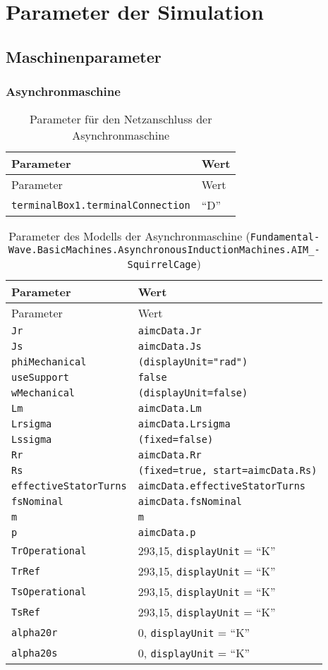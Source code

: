 \chapter{Parameter der Simulation}
\label{chap:ParameterDerSimulation}

\hypertarget{maschinenparameter}{%
\section{Maschinenparameter}\label{maschinenparameter}}

\hypertarget{asynchronmaschine}{%
\subsection{Asynchronmaschine}\label{asynchronmaschine}}
\begin{longtable}[]{@{}ll@{}}
\caption{Parameter für den Netzanschluss der
Asynchronmaschine}\tabularnewline
\toprule
Parameter & Wert\tabularnewline
\midrule
\endfirsthead
\toprule
Parameter & Wert\tabularnewline
\midrule
\endhead
\texttt{terminalBox1.terminalConnection} & ``D''\tabularnewline
\bottomrule
\end{longtable}

\begin{longtable}[]{@{}ll@{}}
\caption{Parameter des Modells der Asynchronmaschine
(\texttt{Fun­da­men­tal­Wave.­Basic­Ma­chines.­Asyn­chro­nous­In­duc­tion­Ma­chines.­AIM\_­Squir­rel­Cage})}\tabularnewline
\toprule
Parameter & Wert\tabularnewline
\midrule
\endfirsthead
\toprule
Parameter & Wert\tabularnewline
\midrule
\endhead
\texttt{Jr} & \texttt{aimcData.Jr}\tabularnewline
\texttt{Js} & \texttt{aimcData.Js}\tabularnewline
\texttt{phiMechanical} & \texttt{(displayUnit="rad")}\tabularnewline
\texttt{useSupport} & \texttt{false}\tabularnewline
\texttt{wMechanical} & \texttt{(displayUnit=false)}\tabularnewline
\texttt{Lm} & \texttt{aimcData.Lm}\tabularnewline
\texttt{Lrsigma} & \texttt{aimcData.Lrsigma}\tabularnewline
\texttt{Lssigma} & \texttt{(fixed=false)}\tabularnewline
\texttt{Rr} & \texttt{aimcData.Rr}\tabularnewline
\texttt{Rs} & \texttt{(fixed=true,\ start=aimcData.Rs)}\tabularnewline
\texttt{effectiveStatorTurns} &
\texttt{aimcData.effectiveStatorTurns}\tabularnewline
\texttt{fsNominal} & \texttt{aimcData.fsNominal}\tabularnewline
\texttt{m} & \texttt{m}\tabularnewline
\texttt{p} & \texttt{aimcData.p}\tabularnewline
\texttt{TrOperational} & 293,15, \texttt{displayUnit} =
``K''\tabularnewline
\texttt{TrRef} & 293,15, \texttt{displayUnit} = ``K''\tabularnewline
\texttt{TsOperational} & 293,15, \texttt{displayUnit} =
``K''\tabularnewline
\texttt{TsRef} & 293,15, \texttt{displayUnit} = ``K''\tabularnewline
\texttt{alpha20r} & 0, \texttt{displayUnit} = ``K''\tabularnewline
\texttt{alpha20s} & 0, \texttt{displayUnit} = ``K''\tabularnewline
\bottomrule
\end{longtable}


